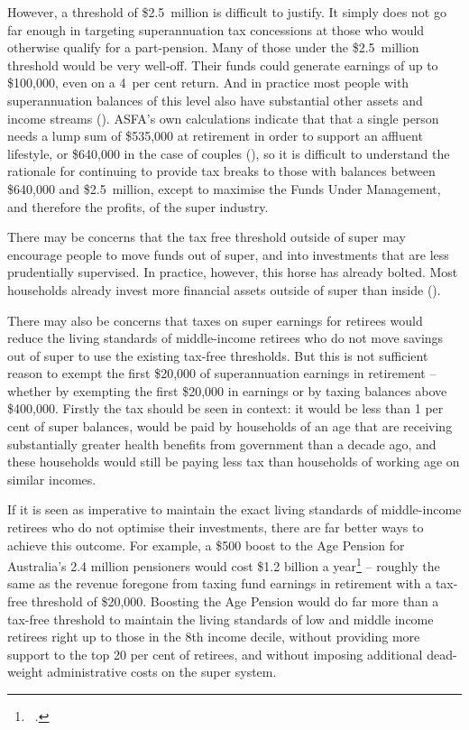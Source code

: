 However, a threshold of \$2.5~million is difficult to justify. It simply does not go far enough in targeting superannuation tax concessions at those who would otherwise qualify for a part-pension. Many of those under the \$2.5~million threshold would be very well-off. Their funds could generate earnings of up to \$100,000, even on a 4~per cent return. And in practice most people with superannuation balances of this level also have substantial other assets and income streams (). ASFA’s own calculations indicate that that a single person needs a lump sum of \$535,000 at retirement in order to support an affluent lifestyle, or \$640,000 in the case of couples (), so it is difficult to understand the rationale for continuing to provide tax breaks to those with balances between \$640,000 and \$2.5~million, except to maximise the Funds Under Management, and therefore the profits, of the super industry. 

There may be concerns that the tax free threshold outside of super may encourage people to move funds out of super, and into investments that are less prudentially supervised. In practice, however, this horse has already bolted. Most households already invest more financial assets outside of super than inside ().

There may also be concerns that taxes on super earnings for retirees would reduce the living standards of middle-income retirees who do not move savings out of super to use the existing tax-free thresholds. But this is not sufficient reason to exempt the first \$20,000 of superannuation earnings in retirement – whether by exempting the first \$20,000 in earnings or by taxing balances above \$400,000. Firstly the tax should be seen in context: it would be less than 1 per cent of super balances, would be paid by households of an age that are receiving substantially greater health benefits from government than a decade ago, and these households would still be paying less tax than households of working age on similar incomes. 

If it is seen as imperative to maintain the exact living standards of middle-income retirees who do not optimise their investments, there are far better ways to achieve this outcome. For example, a \$500 boost to the Age Pension for Australia’s 2.4 million pensioners would cost \$1.2 billion a year\footnote{\gao\ \textcite{NationalCommissionAudit2014}.}  – roughly the same as the revenue foregone from taxing fund earnings in retirement with a tax-free threshold of \$20,000. Boosting the Age Pension would do far more than a tax-free threshold to maintain the living standards of low and middle income retirees right up to those in the 8th income decile, without providing more support to the top 20 per cent of retirees, and without imposing additional dead-weight administrative costs on the super system.

